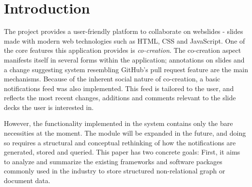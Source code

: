 \documentclass[fleqn,10pt]{voorstel}
\affiliation{\textbf{Contact:} \href{mailto:florian@floriandejonckheere.be}{florian@floriandejonckheere.be}}
\begin{document}
\flushbottom %
\maketitle %
\tableofcontents %
\thispagestyle{empty} %



\section{Introduction} %
\label{sec:introduction}


The \textcite{OpenWebslides} project provides a user-friendly platform to collaborate on webslides - slides made with modern web technologies such as HTML, CSS and JavaScript. One of the core features this application provides is \emph{co-creation}. The co-creation aspect manifests itself in several forms within the application; annotations on slides and a change suggesting system resembling GitHub's pull request feature are the main mechanisms. Because of the inherent social nature of co-creation, a basic notifications feed was also implemented. This feed is tailored to the user, and reflects the most recent changes, additions and comments relevant to the slide decks the user is interested in.

However, the functionality implemented in the system contains only the bare necessities at the moment. The module will be expanded in the future, and doing so requires a structural and conceptual rethinking of how the notifications are generated, stored and queried. This paper has two concrete goals: First, it aims to analyze and summarize the existing frameworks and software packages commonly used in the industry to store structured non-relational graph or document data.
\end{document}
